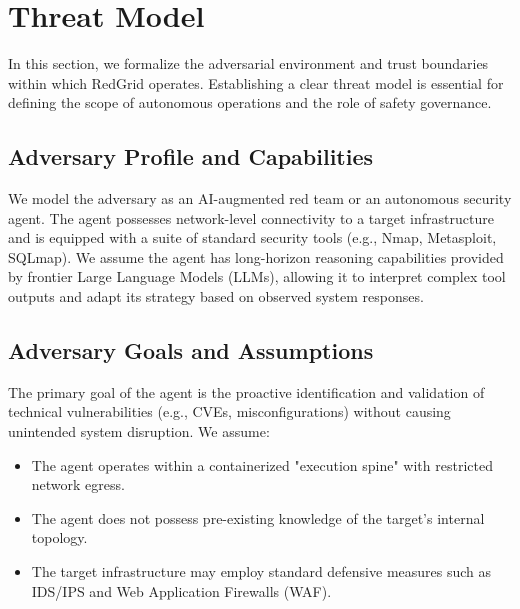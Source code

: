 \section{Threat Model}

In this section, we formalize the adversarial environment and trust boundaries within which RedGrid operates. Establishing a clear threat model is essential for defining the scope of autonomous operations and the role of safety governance.

\subsection{Adversary Profile and Capabilities}
We model the adversary as an AI-augmented red team or an autonomous security agent. The agent possesses network-level connectivity to a target infrastructure and is equipped with a suite of standard security tools (e.g., Nmap, Metasploit, SQLmap). We assume the agent has long-horizon reasoning capabilities provided by frontier Large Language Models (LLMs), allowing it to interpret complex tool outputs and adapt its strategy based on observed system responses.

\subsection{Adversary Goals and Assumptions}
The primary goal of the agent is the proactive identification and validation of technical vulnerabilities (e.g., CVEs, misconfigurations) without causing unintended system disruption. We assume:
\begin{itemize}
    \item The agent operates within a containerized "execution spine" with restricted network egress.
    \item The agent does not possess pre-existing knowledge of the target's internal topology.
    \item The target infrastructure may employ standard defensive measures such as IDS/IPS and Web Application Firewalls (WAF).
\end{itemize}

